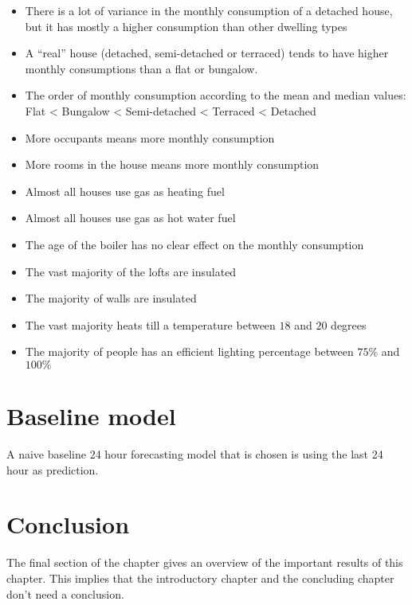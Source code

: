 \begin{itemize}
	\item There is a lot of variance in the monthly consumption of a detached house, but it has mostly a higher consumption than other dwelling types
	\item A ``real'' house (detached, semi-detached or terraced) tends to have higher monthly consumptions than a flat or bungalow.  
	\item The order of monthly consumption according to the mean and median values: Flat < Bungalow < Semi-detached < Terraced < Detached
	\item More occupants means more monthly consumption
	\item More rooms in the house means more monthly consumption
	\item Almost all houses use gas as heating fuel
	\item Almost all houses use gas as hot water fuel
	\item The age of the boiler has no clear effect on the monthly consumption
	\item The vast majority of the lofts are insulated
	\item The majority of walls are insulated
	\item The vast majority heats till a temperature between $ 18 $ and $ 20  $ degrees
	\item The majority of people has an efficient lighting percentage between $ 75\% $ and $ 100\% $
	
\end{itemize}


\section{Baseline model}
A naive baseline 24 hour forecasting model that is chosen is using the last 24 hour as prediction.




\section{Conclusion}
The final section of the chapter gives an overview of the important results
of this chapter. This implies that the introductory chapter and the
concluding chapter don't need a conclusion.





